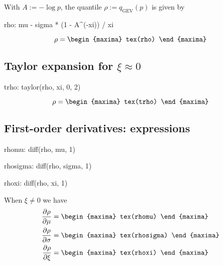 
With $A:= -\log p$, the quantile $\rho := q_{\text{GEV}}(p)$ is given by
\begin{maxima}
  rho: mu - sigma * (1 -  A^(-xi)) / xi
\end{maxima}


\[
\rho=
\begin{maxima}
 tex(rho)
\end{maxima}
\]

\subsection{Taylor expansion for $\xi \approx 0$}

\begin{maxima}
  trho: taylor(rho, xi, 0, 2)
\end{maxima}
{\color{MonVertF}
\begin{equation*}
  \rho = 
  \begin{maxima}
    tex(trho)
  \end{maxima}
\end{equation*}}

\subsection{First-order derivatives: expressions}
\begin{maxima}
   rhomu: diff(rho, mu, 1)
\end{maxima}
\begin{maxima}
  rhosigma: diff(rho, sigma, 1)
\end{maxima}
\begin{maxima}
  rhoxi: diff(rho, xi, 1)
\end{maxima}

When $\xi \neq 0$ we have
{\color{MonVertF}
\begin{align*}
\frac{\partial \rho}{\partial \mu} &=
\begin{maxima}
 tex(rhomu)
\end{maxima}
\\
\frac{\partial \rho}{\partial \sigma}  &=
\begin{maxima}
 tex(rhosigma)
\end{maxima}
\\
\frac{\partial \rho}{\partial \xi} &=
\begin{maxima}
 tex(rhoxi)
\end{maxima}
\end{align*}
}

